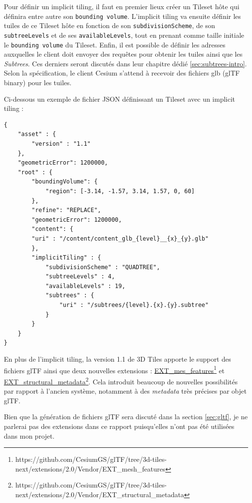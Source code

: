 Pour définir un implicit tiling, il faut en premier lieux créer un Tileset hôte qui définira entre autre son \texttt{bounding volume}. L'implicit tiling va ensuite définir les tuiles de ce Tileset hôte en fonction de son \texttt{subdivisionScheme}, de son \texttt{subtreeLevels} et de ses \texttt{availableLevels}, tout en prenant comme taille initiale le \texttt{bounding volume} du Tileset. Enfin, il est possible de définir les adresses auxquelles le client doit envoyer des requêtes pour obtenir les tuiles ainsi que les \textit{Subtrees}. Ces derniers seront discutés dans leur chapitre dédié \autoref{sec:subtrees-intro}. Selon la spécification, le client Cesium s'attend à recevoir des fichiers glb (glTF binary) pour les tuiles.

\newpage
Ci-dessous un exemple de fichier JSON définissant un Tileset avec un implicit tiling :

\begin{verbatim}
{
    "asset" : {
        "version" : "1.1"
    },
    "geometricError": 1200000,
    "root" : {
        "boundingVolume": {
            "region": [-3.14, -1.57, 3.14, 1.57, 0, 60]
        },
        "refine": "REPLACE",
        "geometricError": 1200000,
        "content": {
        "uri" : "/content/content_glb_{level}__{x}_{y}.glb"
        },
        "implicitTiling" : {
            "subdivisionScheme" : "QUADTREE",
            "subtreeLevels" : 4,
            "availableLevels" : 19,
            "subtrees" : {
                "uri" : "/subtrees/{level}.{x}.{y}.subtree"
            }
        }
    }
}
\end{verbatim}

En plus de l'implicit tiling, la version 1.1 de 3D Tiles apporte le support des fichiers glTF ainsi que deux nouvelles extensions : \href{https://github.com/CesiumGS/glTF/tree/3d-tiles-next/extensions/2.0/Vendor/EXT_mesh_features}{EXT\_mes\_features}\footnote{https://github.com/CesiumGS/glTF/tree/3d-tiles-next/extensions/2.0/Vendor/EXT\_mesh\_features} et \href{https://github.com/CesiumGS/glTF/tree/3d-tiles-next/extensions/2.0/Vendor/EXT_structural_metadata}{EXT\_structural\_metadata}\footnote{https://github.com/CesiumGS/glTF/tree/3d-tiles-next/extensions/2.0/Vendor/EXT\_structural\_metadata}. Cela introduit beaucoup de nouvelles possibilités par rapport à l'ancien système, notamment à des \textit{metadata} très précises par objet glTF.

Bien que la génération de fichiers glTF sera discuté dans la section \ref{sec:gltf}, je ne parlerai pas des extensions dans ce rapport puisqu'elles n'ont pas été utilisées dans mon projet.


